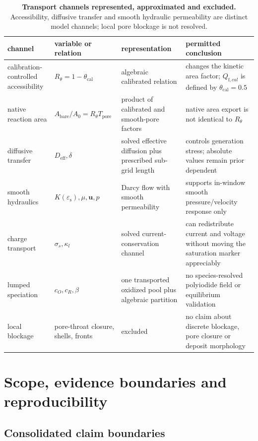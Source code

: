 \documentclass[11pt]{article}
\let\SIorigsubsection\subsection
\renewcommand{\subsection}{\FloatBarrier\SIorigsubsection}
\newcommand{\epss}{\varepsilon_{\mathrm{s}}}
\newcommand{\Deff}{D_{\mathrm{eff}}}
\newcommand{\thetacal}{\theta_{\mathrm{cal}}}
\newcommand{\Rtheta}{R_{\theta}}
\newcommand{\Tpore}{T_{\mathrm{pore}}}
\begin{document}
\begin{table}[!htbp]
\centering\footnotesize
\caption{\textbf{Transport channels represented, approximated and excluded.} Accessibility, diffusive transfer
and smooth hydraulic permeability are distinct model channels; local pore blockage is not resolved.}
\label{tab:transport-channels}
\begin{tabularx}{\textwidth}{@{}P{2.55cm}P{2.7cm}P{2.2cm}Y@{}}
\toprule
channel & variable or relation & representation & permitted conclusion\\
\midrule
calibration-controlled accessibility & $\Rtheta=1-\thetacal$ & algebraic calibrated relation & changes the kinetic area factor; $Q_{\mathrm f,cal}$ is defined by $\thetacal=0.5$\\
native reaction area & $A_{\mathrm{bare}}/A_0=\Rtheta\Tpore$ & product of calibrated and smooth-pore factors & native area export is not identical to $\Rtheta$\\
diffusive transfer & $\Deff,\delta$ & solved effective diffusion plus prescribed sub-grid length & controls generation stress; absolute values remain prior dependent\\
smooth hydraulics & $K(\epss),\mu,\mathbf{u},p$ & Darcy flow with smooth permeability & supports in-window smooth pressure/velocity response only\\
charge transport & $\sigma_s,\kappa_l$ & solved current-conservation channel & can redistribute current and voltage without moving the saturation marker appreciably\\
lumped speciation & $c_O,c_R,\beta$ & one transported oxidized pool plus algebraic partition & no species-resolved polyiodide field or equilibrium validation\\
local blockage & pore-throat closure, shells, fronts & excluded & no claim about discrete blockage, pore closure or deposit morphology\\
\bottomrule
\end{tabularx}
\end{table}

\section{Scope, evidence boundaries and reproducibility}

\subsection{Consolidated claim boundaries}
\end{document}
